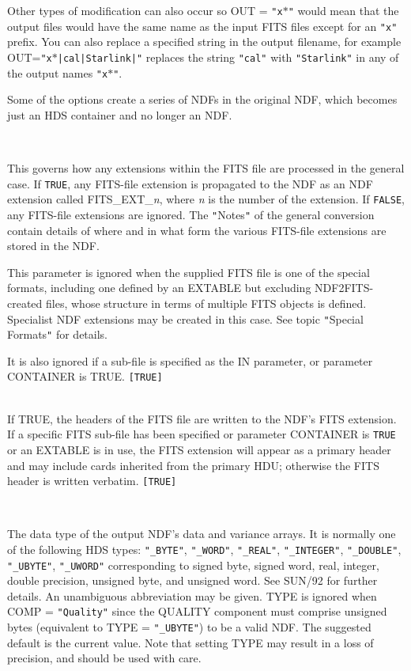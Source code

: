 \documentclass[twoside,11pt]{article}
\newcommand{\htmlref}[2]{#1}
\newcommand{\xref}[3]{#1}
\newcommand{\sstsubsection}[1]{ \item[{#1}] \mbox{} \\}
\newcommand{\sstsubsection}[1]{\item[{#1}]}
\begin{document}
{{{         Other types of modification can also occur so OUT = \texttt{"x$*$"}
         would mean that the output files would have the same name as the
         input FITS files except for an \texttt{"x"} prefix.  You can also
         replace a specified string in the output filename, for example
         OUT=\texttt{"x$*$|cal|Starlink|"} replaces the string
         \texttt{"cal"} with \texttt{"Starlink"} in any of the output names
         \texttt{"x$*$"}.

         Some of the options create a series of NDFs in the original NDF,
         which becomes just an HDS container and no longer an NDF.
      }
      \sstsubsection{
         PROEXTS = \_LOGICAL (Read)
      }{
         This governs how any extensions within the FITS file are processed 
         in the general case.  If \texttt{TRUE}, any FITS-file extension is
         propagated to the NDF as an NDF extension
         called FITS\_EXT\_\textit{n}, where \textit{n} is the number of the 
         extension.
         If \texttt{FALSE}, any FITS-file extensions are ignored.  The
         \texttt{"}Notes\texttt{"} of the general conversion contain details of
         where and in what form the various FITS-file extensions are stored
         in the NDF.

         This parameter is ignored when the supplied FITS file is one
         of the special formats, including one defined by an EXTABLE but
         excluding NDF2FITS-created files, whose structure in terms of
         multiple FITS objects is defined. Specialist NDF extensions may be
         created in this case.  See topic 
         \htmlref{\texttt{"}Special Formats\texttt{"}}{special_formats}
         for details.

         It is also ignored if a sub-file is specified as the IN parameter,
         or parameter CONTAINER is TRUE.  \texttt{[TRUE]}
      }
      \sstsubsection{
         PROFITS = \_LOGICAL (Read)
      }{
         If TRUE, the headers of the FITS file are written to the NDF's
         FITS extension.  If a specific FITS sub-file has been specified or
         parameter CONTAINER is \texttt{TRUE} or an EXTABLE is in use, the FITS
         extension will appear as a primary header and may include cards
         inherited from the primary HDU; otherwise the FITS header is
         written verbatim. \texttt{[TRUE]}
      }
      \sstsubsection{
         TYPE = LITERAL (Read)
      }{
         The data type of the output NDF's data and variance arrays.
	 It is normally one of the following HDS types: \texttt{"\_BYTE"},
	 \texttt{"\_WORD"}, \texttt{"\_REAL"}, \texttt{"\_INTEGER"},
	 \texttt{"\_DOUBLE"}, \texttt{"\_UBYTE"}, \texttt{"\_UWORD"}
	 corresponding to signed byte, signed word, real, integer,
	 double precision, unsigned byte, and unsigned word.  See
	 \xref{SUN/92}{sun92}{} for further details.  An unambiguous
	 abbreviation may be given.  TYPE is ignored when COMP =
	 \texttt{"Quality"} since the QUALITY component must comprise
	 unsigned bytes (equivalent to TYPE = \texttt{"\_UBYTE"}) to
	 be a valid NDF.  The suggested default is the current value.
	 Note that setting TYPE may result in a loss of precision, and
	 should be used with care.

}}}
\end{document}
